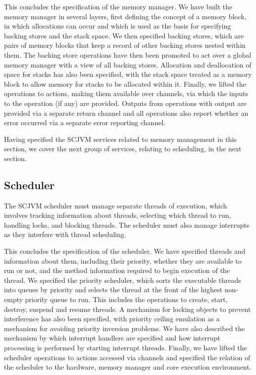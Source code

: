 

This concludes the specification of the memory manager.
We have built the memory manager in several layers, first defining the
concept of a memory block, in which allocations can occur and which is
used as the basis for specifying backing stores and the stack space.
We then specified backing stores, which are pairs of memory blocks
that keep a record of other backing stores nested within them.
The backing store operations have then been promoted to act over a
global memory manager with a view of all backing stores.
Allocation and deallocation of space for stacks has also been
specified, with the stack space treated as a memory block to allow
memory for stacks to be allocated within it.
Finally, we  lifted the operations to \Circus{} actions,
making them available over channels, via which the inputs to the
operation (if any) are provided.
Outputs from operations with output are provided via a separate return
channel and all operations also report whether an error occurred via a
separate error reporting channel.

Having specified the SCJVM services related to memory management in
this section, we cover the next group of services, relating to
scheduling, in the next section.

\subsection{Scheduler}
\label{scheduler-model-section}

The SCJVM scheduler must manage separate threads of execution, which
involves tracking information about threads, selecting which thread to
run, handling locks, and blocking threads.
The scheduler must also manage interrupts as they interfere with
thread scheduling.



This concludes the specification of the scheduler.
We have specified threads and information about them, including their
priority, whether they are available to run or not, and the method
information required to begin execution of the thread.
We specified the priority scheduler, which sorts the executable
threads into queues by priority and selects the thread at the front of
the highest non-empty priority queue to run.
This includes the operations to create, start, destroy, suspend and
resume threads.
A mechanism for locking objects to prevent interference has also been
specified, with priority ceiling emulation as a mechanism for avoiding
priority inversion problems.
We have also described the mechanism by which interrupt handlers are
specified and how interrupt processing is performed by starting
interrupt threads.
Finally, we have lifted the scheduler operations to \Circus{} actions
accessed via channels and specified the relation of the scheduler to
the hardware, memory manager and core execution environment.

